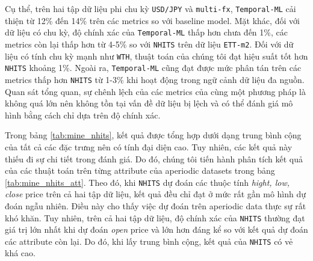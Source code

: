 
Cụ thể, trên hai tập dữ liệu phi chu kỳ \verb|USD/JPY| và \verb|multi-fx|, \verb|Temporal-ML| cải thiện từ 12\% đến 14\% trên các metrics so với baseline model. Mặt khác, đối với dữ liệu có chu kỳ, độ chính xác của \verb|Temporal-ML| thấp hơn chưa đến 1\%, các metrics còn lại thấp hơn từ 4-5\% so với \verb|NHITS| trên dữ liệu \verb|ETT-m2|. Đối với dữ liệu có tính chu kỳ mạnh như \verb|WTH|, thuật toán của chúng tôi đạt hiệu suất tốt hơn \verb|NHITS| khoảng 1\%. Ngoài ra, \verb|Temporal-ML| cũng đạt được mức phân tán trên các metrics thấp hơn \verb|NHITS| từ 1-3\% khi hoạt động trong ngữ cảnh dữ liệu đa nguồn. Quan sát tổng quan, sự chênh lệch của các metrics của cùng một phương pháp là không quá lớn nên không tồn tại vấn đề dữ liệu bị lệch và có thể đánh giá mô hình bằng cách chỉ dựa trên độ chính xác.

Trong bảng \ref{tab:mine_nhits}, kết quả được tổng hợp dưới dạng trung bình cộng của tất cả các đặc trưng nên có tính đại diện cao. Tuy nhiên, các kết quả này thiếu đi sự chi tiết trong đánh giá. Do đó, chúng tôi tiến hành phân tích kết quả của các thuật toán trên từng attribute của aperiodic datasets trong bảng \ref{tab:mine_nhits_att}. Theo đó, khi \verb|NHITS| dự đoán các thuộc tính \textit{hight, low, close} price trên cả hai tập dữ liệu, kết quả đều chỉ đạt ở mức rất gần mô hình dự đoán ngẫu nhiên. Điều này cho thấy việc dự đoán trên aperiodic data thực sự rất khó khăn. Tuy nhiên, trên cả hai tập dữ liệu, độ chính xác của \verb|NHITS| thường đạt giá trị lớn nhất khi dự đoán \textit{open} price và lớn hơn đáng kể so với kết quả dự đoán các attribute còn lại. Do đó, khi lấy trung bình cộng, kết quả của \verb|NHITS| có vẻ khá cao.

